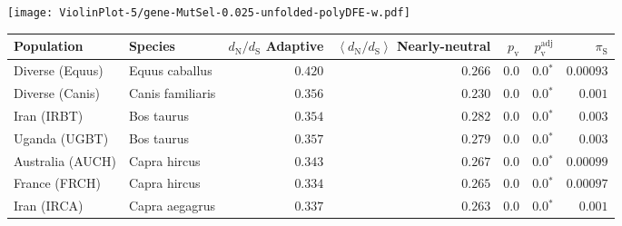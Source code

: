 \begin{center}
\begin{adjustbox}{width = 1\textwidth}
\begin{tabular}{|l|l|r|r|r|r|r|r|r|}
\bottomrule
\end{tabular}
\end{adjustbox}
\newpage
\texttt{[image: ViolinPlot-5/gene-MutSel-0.025-unfolded-polyDFE-w.pdf]} 
\begin{adjustbox}{width = 1\textwidth}
\begin{tabular}{|l|l|r|r|r|r|r|}
\toprule
                     Population &              Species & \specialcell{$d_{\mathrm{N}} / d_{\mathrm{S}}$ \\ Adaptive} & \specialcell{$\left< d_{\mathrm{N}} / d_{\mathrm{S}} \right>$ \\ Nearly-neutral} & $p_{\mathrm{v}}$ & $p_{\mathrm{v}}^{\mathrm{adj}}$ & $\pi_{\textrm{S}}$ \\
\midrule
                Diverse (Equus) &       Equus caballus &                                           $ 0.420$ &                                           $ 0.266$ &            $0.0$ &                  $\bm{0.0{^*}}$ &          $0.00093$ \\
                Diverse (Canis) &     Canis familiaris &                                           $ 0.356$ &                                           $ 0.230$ &            $0.0$ &                  $\bm{0.0{^*}}$ &           $ 0.001$ \\
                    Iran (IRBT) &           Bos taurus &                                           $ 0.354$ &                                           $ 0.282$ &            $0.0$ &                  $\bm{0.0{^*}}$ &           $ 0.003$ \\
                  Uganda (UGBT) &           Bos taurus &                                           $ 0.357$ &                                           $ 0.279$ &            $0.0$ &                  $\bm{0.0{^*}}$ &           $ 0.003$ \\
               Australia (AUCH) &         Capra hircus &                                           $ 0.343$ &                                           $ 0.267$ &            $0.0$ &                  $\bm{0.0{^*}}$ &          $0.00099$ \\
                  France (FRCH) &         Capra hircus &                                           $ 0.334$ &                                           $ 0.265$ &            $0.0$ &                  $\bm{0.0{^*}}$ &          $0.00097$ \\
                    Iran (IRCA) &       Capra aegagrus &                                           $ 0.337$ &                                           $ 0.263$ &            $0.0$ &                  $\bm{0.0{^*}}$ &           $ 0.001$ \\

\end{tabular}
\end{adjustbox}
\end{center}
